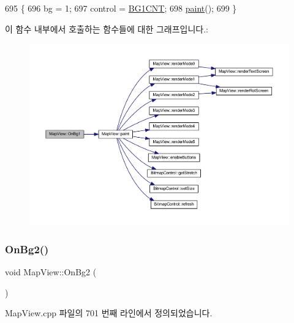 \begin{DoxyCode}
695 \{
696   bg = 1;
697   control = \mbox{\hyperlink{_globals_8cpp_af2dab781fc00b14c17ae0357c3c13b84}{BG1CNT}};
698   \mbox{\hyperlink{class_map_view_a89edf3053cffa4a68516178dbd987339}{paint}}();
699 \}
\end{DoxyCode}
이 함수 내부에서 호출하는 함수들에 대한 그래프입니다.\+:
\nopagebreak
\begin{figure}[H]
\begin{center}
\leavevmode
\includegraphics[width=350pt]{class_map_view_a67a49b3a77fa0205f7729a391d45f26c_cgraph}
\end{center}
\end{figure}
\mbox{\label{class_map_view_a886ec2fa23dba5da34cdbc6f004c1bea}} 
\subsubsection{\texorpdfstring{On\+Bg2()}{OnBg2()}}
{\footnotesize\ttfamily void Map\+View\+::\+On\+Bg2 (\begin{DoxyParamCaption}{ }\end{DoxyParamCaption})\hspace{0.3cm}{\ttfamily [protected]}}



Map\+View.\+cpp 파일의 701 번째 라인에서 정의되었습니다.



